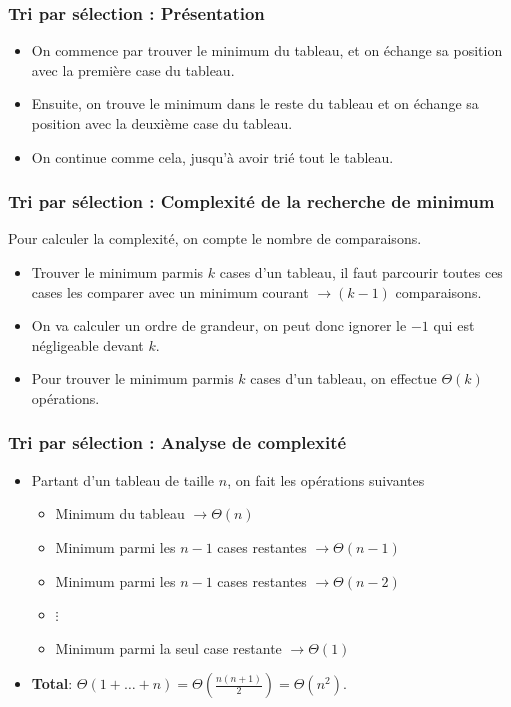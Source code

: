 \documentclass[aspectratio=169]{beamer}
\begin{document}
\begin{frame}
  \frametitle{Tri par sélection : Présentation}
  \begin{itemize}
  \item On commence par trouver le minimum du tableau, et on
    échange sa position avec la première case du tableau.

  \item Ensuite, on trouve le minimum dans le reste du tableau et on échange sa
    position avec la deuxième case du tableau.

  \item On continue comme cela, jusqu'à avoir trié tout le tableau.
  \end{itemize}
\end{frame}

\begin{frame}
  \frametitle{Tri par sélection : Complexité de la recherche de minimum}
  \alert{Pour calculer la complexité, on compte le nombre de comparaisons.}

  \begin{itemize}
  \item Trouver le minimum parmis \(k\) cases d'un tableau, il faut parcourir
    toutes ces cases les comparer avec un minimum courant \(\to (k-1)\)
    comparaisons.

  \item On va calculer un ordre de grandeur, on peut donc ignorer le \(-1\) qui
    est négligeable devant \(k\).

  \item Pour trouver le minimum parmis \(k\) cases d'un tableau, on effectue
    \(\Theta(k)\) opérations.

  \end{itemize}
\end{frame}

\begin{frame}
  \frametitle{Tri par sélection : Analyse de complexité}

  \begin{itemize}
  \item Partant d'un tableau de taille \(n\), on fait les opérations suivantes
    \begin{itemize}
    \item Minimum du tableau \(\to \Theta (n)\)
    \item Minimum parmi les \(n-1\) cases restantes \(\to \Theta (n-1)\)
    \item Minimum parmi les \(n-1\) cases restantes \(\to \Theta(n-2)\)
    \item[] \(\vdots\)
    \item Minimum parmi la seul case restante \(\to \Theta(1)\)
    \end{itemize}

  \item \alert{\textbf{Total}}: \(\Theta(1+\ldots+n) = \Theta(\frac{n(n+1)}{2})
    = \Theta(n^{2})\).
  \end{itemize}
\end{frame}
\end{document}
